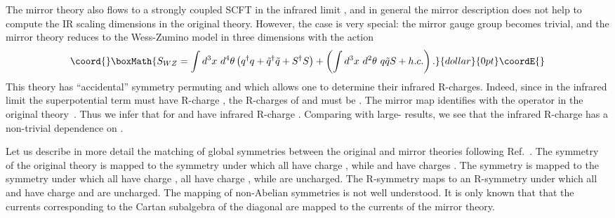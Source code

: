 \documentclass[a4paper,12pt, amsfonts, amssymb]{article}
\providecommand{\ra}{\rightarrow}
\providecommand{\tQ}{{\tilde Q}}
\providecommand{\tq}{{\tilde q}}
\begin{document}
The mirror theory also flows to a strongly coupled SCFT in the infrared
limit \myHighlight{$e\ra\infty$}\coordHE{}, and in general the mirror description does not help to 
compute the IR scaling dimensions in the original theory. 
However, the case \coordHE{} is very special: the mirror gauge group becomes
trivial, and the mirror theory reduces to the
Wess-Zumino model in three dimensions with the action
$$\coord{}\boxMath{
S_{WZ}=\int d^3x\ d^4\theta\left(q^\dag q+ \tq^\dag\tq + S^\dag S\right)
+\left(\int d^3x\ d^2\theta\ q\tq S + h.c.\right).
}{dollar}{0pt}\coordE{}$$
This theory has ``accidental'' \coordHE{} symmetry permuting \myHighlight{$q,\tq,$}\coordHE{} and
\coordHE{} which allows one to determine their infrared R-charges. Indeed, since
in the infrared limit the superpotential term must have R-charge \coordHE{},
the R-charges of \myHighlight{$q,\tq$}\coordHE{} and \coordHE{} must be \coordHE{}. The mirror map identifies \coordHE{} with the operator \myHighlight{$Q\tQ$}\coordHE{} in the original theory~\cite{five}.
Thus we infer that for \coordHE{}  \coordHE{} and \myHighlight{$\tQ$}\coordHE{} have infrared R-charge \coordHE{}. 
Comparing with large-\coordHE{} results, we see that the infrared R-charge has a non-trivial dependence on \coordHE{}. 

Let us describe in more detail the matching of global symmetries between
the original and mirror theories following Ref.~\cite{five}. 
The symmetry \coordHE{} of the original
theory is mapped to the symmetry under which all \coordHE{} have charge \coordHE{}, while \coordHE{} and \myHighlight{$\tq_j$}\coordHE{} have charges \coordHE{}. The symmetry \coordHE{} is mapped to 
the \coordHE{} symmetry under which all \coordHE{} have charge \coordHE{}, all \myHighlight{$\tq_j$}\coordHE{}
have charge \coordHE{}, while \coordHE{} are uncharged. The R-symmetry \coordHE{}
maps to an R-symmetry under which all \coordHE{} and \myHighlight{$\tq_j$}\coordHE{} have charge \coordHE{} 
and \coordHE{} are uncharged. The mapping of non-Abelian
symmetries is not well understood. It is only known that that the currents
corresponding to the Cartan subalgebra of the diagonal \coordHE{} are mapped 
to the \coordHE{}  \coordHE{} currents of the mirror theory. 
\end{document}
